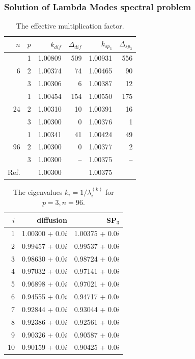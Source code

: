 \documentclass[authoryear]{elsarticle}
\begin{document}
\subsubsection{Solution of Lambda Modes spectral problem}

\begin{table}[h]
\caption{The effective multiplication factor.}
\label{tab:iaea_cosym_lambda}
\begin{center}
\begin{tabular}{r r r r r r}
\hline
$n$ & $p$ & $k_{dif}$ & $\Delta_{dif}$ &$k_{sp_3}$& $\Delta_{sp_3}$ \\
\hline
	& 1	& 1.00809& 509& 1.00931& 556\\
6	& 2	& 1.00374&  74& 1.00465&  90\\
	& 3	& 1.00306&   6& 1.00387&  12\\
\hline
	& 1	& 1.00454& 154& 1.00550& 175\\
24& 2	& 1.00310&  10& 1.00391&  16\\
	& 3	& 1.00300&   0& 1.00376&   1\\ 
\hline
	& 1	& 1.00341&  41& 1.00424&  49\\
96& 2	& 1.00300&   0& 1.00377&   2\\
	& 3	& 1.00300&  --& 1.00375&  --\\ 
\hline
Ref.&   & 1.00300&    & 1.00375&    \\ 
\hline
\end{tabular}
\end{center}
\end{table}

\begin{table}[h]
\caption{The eigenvalues $k_i=1/\lambda_i^{(k)}$ for $p=3, n=96$.}
\label{tab:iaea_cosym_lambda_10}
\begin{center}
\begin{tabular}{rrr}
\hline
$i$ & diffusion & SP$_3$  \\
\hline
1 & 1.00300 + 0.0$i$ & 1.00375 + 0.0$i$\\
2 & 0.99457 + 0.0$i$ & 0.99537 + 0.0$i$\\
3 & 0.98630 + 0.0$i$ & 0.98724 + 0.0$i$\\
4 & 0.97032 + 0.0$i$ & 0.97141 + 0.0$i$\\
5 & 0.96898 + 0.0$i$ & 0.97021 + 0.0$i$\\
6 & 0.94555 + 0.0$i$ & 0.94717 + 0.0$i$\\
7 & 0.92844 + 0.0$i$ & 0.93044 + 0.0$i$\\
8 & 0.92386 + 0.0$i$ & 0.92561 + 0.0$i$\\
9 & 0.90326 + 0.0$i$ & 0.90587 + 0.0$i$\\
10 & 0.90159 + 0.0$i$ & 0.90425 + 0.0$i$\\
\hline
\end{tabular}
\end{center}
\end{table}
\end{document}
